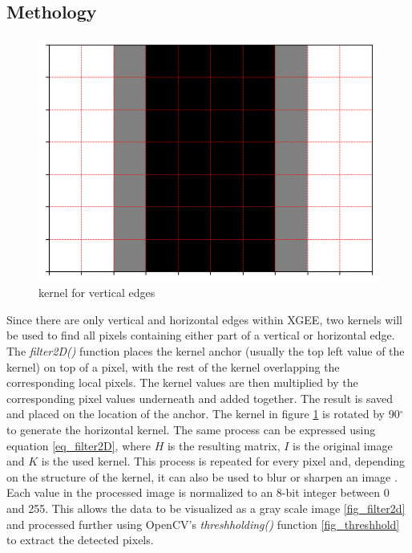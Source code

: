 \subsection{Methology}
\begin{figure}
    \centering
    \includegraphics[width=\linewidth]{Pictures/kernel_ver.png}
    \caption{kernel for vertical edges}
    \label{fig_kernel_ver}
\end{figure}
Since there are only vertical and horizontal edges within XGEE, two kernels will be used to find all pixels containing either part of a vertical or horizontal edge. The \textit{filter2D()} function places the kernel anchor (usually the top left value of the kernel) on top of a pixel, with the rest of the kernel overlapping the corresponding local pixels. The kernel values are then multiplied by the corresponding pixel values underneath and added together. The result is saved and placed on the location of the anchor. The kernel in figure \ref{fig_kernel_ver} is rotated by 90$^{\circ}$ to generate the horizontal kernel. The same process can be expressed using equation \ref{eq_filter2D}, where $H$ is the resulting matrix, $I$ is the original image and $K$ is the used kernel. This process is repeated for every pixel and, depending on the structure of the kernel, it can also be used to blur or sharpen an image \cite{web_filter2D}.\\
Each value in the processed image is normalized to an 8-bit integer between 0 and 255. This allows the data to be visualized as a gray scale image \ref{fig_filter2d} and processed further using OpenCV's \textit{threshholding()} function \ref{fig_threshhold} to extract the detected pixels.\\
